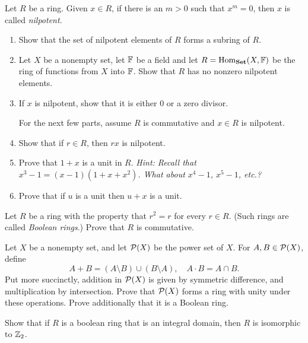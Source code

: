 \documentclass[./main.tex]{subfiles}
\begin{document}
\begin{exercise}
\label{ex:nilpotent-elements}
    Let $R$ be a ring. Given $x \in R$, if there is an $m > 0$ such that $x^m =
    0$, then $x$ is called \emph{nilpotent}.

    \begin{enumerate}[label=(\alph*)]
        \item Show that the set of nilpotent elements of $R$ forms a subring of
        $R$. 
        \item Let $X$ be a nonempty set, let $\mathbb{F}$ be a field and let $R =
        \operatorname{Hom}_{\mathbf{Set}}(X, \mathbb{F})$ be the ring of functions
        from $X$ into $\mathbb{F}$. Show that $R$ has no nonzero nilpotent elements.
        \item If $x$ is nilpotent, show that it is either 0 or a zero divisor.
        
        For the next few parts, assume $R$ is commutative and $x \in R$ is nilpotent.
        
        \item Show that if $r \in R$, then $rx$ is nilpotent.
        \item Prove that $1+x$ is a unit in $R$. \emph{Hint: Recall that $x^3 -
        1 = (x-1)(1 + x + x^2)$. What about $x^4 - 1$, $x^5 - 1$, etc.?}
        \item Prove that if $u$ is a unit then $u + x$ is a unit.
    \end{enumerate}
\end{exercise}

\begin{exercise}
\label{ex:boolean-rings-commutative}
    Let $R$ be a ring with the property that $r^2 = r$ for every $r \in R$.
    (Such rings are called \emph{Boolean rings}.) Prove that $R$ is commutative.
\end{exercise}

\begin{exercise}
    Let $X$ be a nonempty set, and let $\mathcal{P}(X)$ be the power set of $X$. For
    $A, B \in \mathcal{P}(X)$, define 
    \[
        A + B = (A \setminus B) \cup (B \setminus A), \quad A \cdot B = A \cap B.
    \]
    Put more succinctly, addition in $\mathcal{P}(X)$ is given by symmetric
    difference, and multiplication by intersection. Prove that $\mathcal{P}(X)$
    forms a ring with unity under these operations. Prove additionally that it
    is a Boolean ring.
\end{exercise}

\begin{exercise}
    Show that if $R$ is a boolean ring that is an integral domain, then $R$ is
    isomorphic to $\mathbb{Z}_2$.
\end{exercise}
\end{document}
